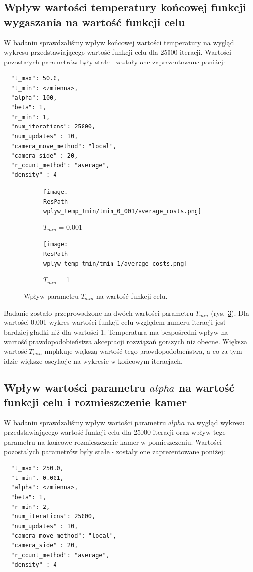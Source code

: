 \documentclass[12pt,a4paper]{article}
\newcommand{\ResPath}{../badania/}
\begin{document}
\subsection{Wpływ wartości temperatury końcowej funkcji wygaszania na wartość
funkcji celu}
W badaniu sprawdzaliśmy wpływ końcowej wartości temperatury na wygląd wykresu
przedstawiającego wartość funkcji celu dla 25000 iteracji. Wartości pozostałych
parametrów były stałe - zostały one zaprezentowane poniżej:

\begin{lstlisting}
  "t_max": 50.0,
  "t_min": <zmienna>,
  "alpha": 100,
  "beta": 1,
  "r_min": 1,
  "num_iterations": 25000,
  "num_updates" : 10,
  "camera_move_method": "local",
  "camera_side" : 20,
  "r_count_method": "average",
  "density" : 4
\end{lstlisting}
\begin{figure}[htb]
  \begin{subfigure}[b]{0.5\linewidth}
    \centering
    \texttt{[image: \\ResPath wplyw\_temp\_tmin/tmin\_0\_001/average\_costs.png]}
    \caption{$T_{min}$ = 0.001}
    \label{fig_tmin:a}
    \vspace{2ex}
  \end{subfigure}%
  \begin{subfigure}[b]{0.5\linewidth}
    \texttt{[image: \\ResPath wplyw\_temp\_tmin/tmin\_1/average\_costs.png]}
    \caption{$T_{min}$ = 1}
    \label{fig_tmin:b}
    \vspace{2ex}
  \end{subfigure}
  \caption{Wpływ parametru $T_{min}$ na wartość funkcji celu.}
  \label{fig_tmin}
\end{figure}
\newpage
Badanie zostało przeprowadzone na dwóch wartości parametru $T_{min}$
(rys.\ \ref{fig_tmin}).
Dla wartości 0.001 wykres wartości funkcji celu względem numeru iteracji
jest bardziej gładki niż dla wartości 1. Temperatura ma bezpośredni wpływ na wartość
prawdopodobieństwa akceptacji rozwiązań gorszych niż obecne. Większa wartość $T_{min}$
implikuje większą wartość tego prawdopodobieństwa, a co za tym idzie większe oscylacje na wykresie w końcowym iteracjach.

\subsection{Wpływ wartości parametru $alpha$ na wartość funkcji celu i rozmieszczenie kamer}
W badaniu sprawdzaliśmy wpływ wartości parametru $alpha$ na wygląd wykresu przedstawiającego
wartość funkcji celu dla 25000 iteracji oraz wpływ tego parametru na końcowe rozmieszczenie kamer w pomieszczeniu.
Wartości pozostałych parametrów były stałe - zostały one zaprezentowane poniżej:
\begin{lstlisting}
  "t_max": 250.0,
  "t_min": 0.001,
  "alpha": <zmienna>,
  "beta": 1,
  "r_min": 2,
  "num_iterations": 25000,
  "num_updates" : 10,
  "camera_move_method": "local",
  "camera_side" : 20,
  "r_count_method": "average",
  "density" : 4
\end{lstlisting}
\end{document}
